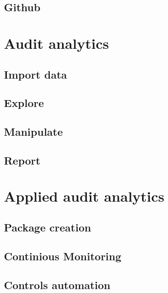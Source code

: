 \documentclass[
]{book}
\begin{document}
\hypertarget{github}{%
\section{Github}\label{github}}

\hypertarget{audit-analytics}{%
\chapter{Audit analytics}\label{audit-analytics}}

\hypertarget{import-data}{%
\section{Import data}\label{import-data}}

\hypertarget{explore}{%
\section{Explore}\label{explore}}

\hypertarget{manipulate}{%
\section{Manipulate}\label{manipulate}}

\hypertarget{report}{%
\section{Report}\label{report}}

\hypertarget{applied-audit-analytics}{%
\chapter{Applied audit analytics}\label{applied-audit-analytics}}

\hypertarget{package-creation}{%
\section{Package creation}\label{package-creation}}

\hypertarget{continious-monitoring}{%
\section{Continious Monitoring}\label{continious-monitoring}}

\hypertarget{controls-automation}{%
\section{Controls automation}\label{controls-automation}}
\end{document}
